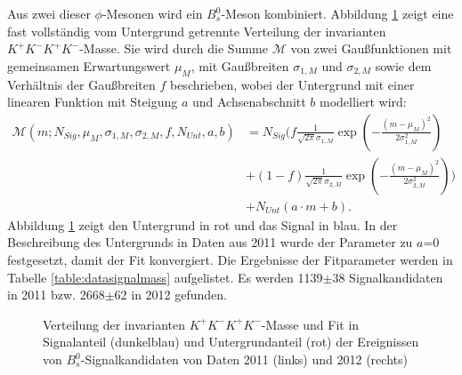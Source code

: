 \documentclass{article}
\begin{document}
Aus zwei dieser $\phi$-Mesonen wird ein $B_s^0$-Meson kombiniert. Abbildung \ref{fig:datasignalmass} zeigt eine fast vollständig vom Untergrund getrennte Verteilung der invarianten $K^+K^-K^+K^-$-Masse. Sie wird durch die Summe $\mathcal{M}$ von zwei Gaußfunktionen mit gemeinsamen Erwartungswert $\mu_M$, mit Gaußbreiten $\sigma_{1,M}$ und $\sigma_{2,M}$  sowie dem Verhältnis der Gaußbreiten $f$ beschrieben, wobei der Untergrund mit einer linearen Funktion mit Steigung $a$ und Achsenabschnitt $b$ modelliert wird:
\begin{align*}
\mathcal{M}(m;N_{Sig},\mu_M,\sigma_{1,M},\sigma_{2,M},f,N_{Unt},a,b)&=N_{Sig} \big( f \frac{1}{\sqrt{2 \pi} \sigma_{1,M}} \exp(-{\frac{(m-\mu_M)^2}{2 \sigma_{1,M}^2}})\\&+(1-f)\frac{1}{\sqrt{2 \pi} \sigma_{2,M}} \exp(-{\frac{(m-\mu_M)^2}{2 \sigma_{2,M}^2}}) \big)\\&+N_{Unt}(a \cdot m+b). 
\end{align*}
Abbildung \ref{fig:datasignalmass} zeigt den Untergrund in rot und das Signal in blau. In der Beschreibung des Untergrunds in Daten aus 2011 wurde der Parameter zu $a$=0 festgesetzt, damit der Fit konvergiert. Die Ergebnisse der Fitparameter werden in Tabelle \ref{table:datasignalmass} aufgelistet. Es werden 1139$\pm$38 Signalkandidaten in 2011 bzw. 2668$\pm$62 in 2012 gefunden.

\begin{figure}[h!]
\centering
 \caption{Verteilung der invarianten $K^+K^-K^+K^-$-Masse und Fit in Signalanteil (dunkelblau) und Untergrundanteil (rot) der Ereignissen von $B_s^0$-Signalkandidaten von Daten 2011 (links) und 2012 (rechts)}
\label{fig:datasignalmass}
\end{figure} 
\end{document}
